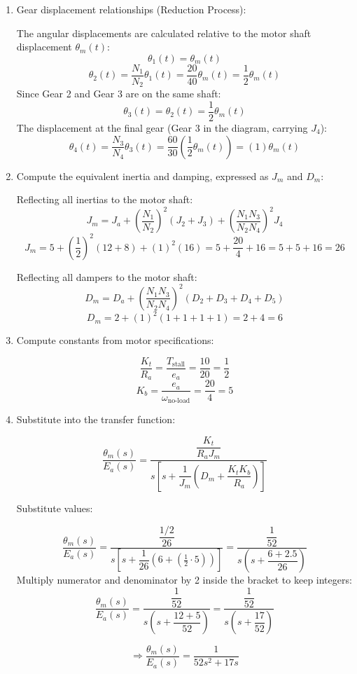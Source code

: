 \documentclass[11pt]{article}
\begin{document}
\begin{enumerate}[label=(\alph*), itemindent=*, leftmargin=*, nolistsep]
    
    \item Gear displacement relationships (Reduction Process):
    
    The angular displacements are calculated relative to the motor shaft displacement \(\theta_m(t)\):
    \[
    \theta_1(t) = \theta_m(t)
    \]
    \[
    \theta_2(t) = \frac{N_1}{N_2} \theta_1(t) = \frac{20}{40} \theta_m(t) = \frac{1}{2} \theta_m(t)
    \]
    Since Gear 2 and Gear 3 are on the same shaft:
    \[
    \theta_3(t) = \theta_2(t) = \frac{1}{2} \theta_m(t)
    \]
    The displacement at the final gear (Gear 3 in the diagram, carrying \(J_4\)):
    \[
    \theta_4(t) = \frac{N_3}{N_4} \theta_3(t) = \frac{60}{30} \left( \frac{1}{2} \theta_m(t) \right) = (1) \theta_m(t)
    \]
    
    \item Compute the equivalent inertia and damping, expressed as \( J_m \) and \( D_m \):
    
    Reflecting all inertias to the motor shaft:
    \[
    J_m = J_a + \left( \frac{N_1}{N_2} \right)^2 (J_2 + J_3) + \left( \frac{N_1 N_3}{N_2 N_4} \right)^2 J_4
    \]
    \[
    J_m = 5 + \left( \frac{1}{2} \right)^2 (12 + 8) + (1)^2 (16) = 5 + \frac{20}{4} + 16 = 5 + 5 + 16 = \boxed{26}
    \]
    
    Reflecting all dampers to the motor shaft:
    \[
    D_m = D_a + \left( \frac{N_1 N_3}{N_2 N_4} \right)^2 (D_2 + D_3 + D_4 + D_5)
    \]
    \[
    D_m = 2 + (1)^2 (1 + 1 + 1 + 1) = 2 + 4 = \boxed{6}
    \]
    
    \item Compute constants from motor specifications:
    
    \[
    \frac{K_t}{R_a} = \frac{T_{\text{stall}}}{e_a} = \frac{10}{20} = \frac{1}{2}
    \]
    \[
    K_b = \frac{e_a}{\omega_{\text{no-load}}} = \frac{20}{4} = 5
    \]
    
    \item Substitute into the transfer function:
    
    \[
    \frac{\theta_m(s)}{E_a(s)} = 
    \frac{\dfrac{K_t}{R_a J_m}}{s \left[ s + \dfrac{1}{J_m} \left( D_m + \dfrac{K_t K_b}{R_a} \right) \right]}
    \]
    
    Substitute values:
    
    \[
    \frac{\theta_m(s)}{E_a(s)} = 
    \frac{\dfrac{1/2}{26}}{s \left[ s + \dfrac{1}{26} \left( 6 + \left( \frac{1}{2} \cdot 5 \right) \right) \right]}
    = \frac{\dfrac{1}{52}}{s \left( s + \dfrac{6 + 2.5}{26} \right)}
    \]
    Multiply numerator and denominator by 2 inside the bracket to keep integers:
    \[
    \frac{\theta_m(s)}{E_a(s)} = \frac{\dfrac{1}{52}}{s \left( s + \dfrac{12 + 5}{52} \right)} = \frac{\dfrac{1}{52}}{s \left( s + \dfrac{17}{52} \right)}
    \]
    
    \[
    \Rightarrow
    \boxed{
        \frac{\theta_m(s)}{E_a(s)} = \frac{1}{52 s^2 + 17 s}
    }
    \]
    
\end{enumerate}
\end{document}
